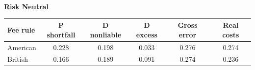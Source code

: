 \documentclass[10pt,border=5pt,varwidth=17cm]{standalone}
\begin{document}
\begingroup
\small
\setlength{\tabcolsep}{5pt}
\renewcommand{\arraystretch}{1.20}
\noindent\textbf{Risk Neutral}\par\smallskip
\noindent\begin{tabularx}{\linewidth}{@{}>{\raggedright\arraybackslash}Xccccc@{}}
\toprule
\textbf{Fee rule} & \textbf{P shortfall} & \textbf{D nonliable} & \textbf{D excess} & \textbf{Gross error} & \textbf{Real costs} \\
\midrule
American & 0.228 & 0.198 & 0.033 & 0.276 & 0.274 \\
British & 0.166 & 0.189 & 0.091 & 0.274 & 0.236 \\
\bottomrule\end{tabularx}\par\medskip
\endgroup
\end{document}
